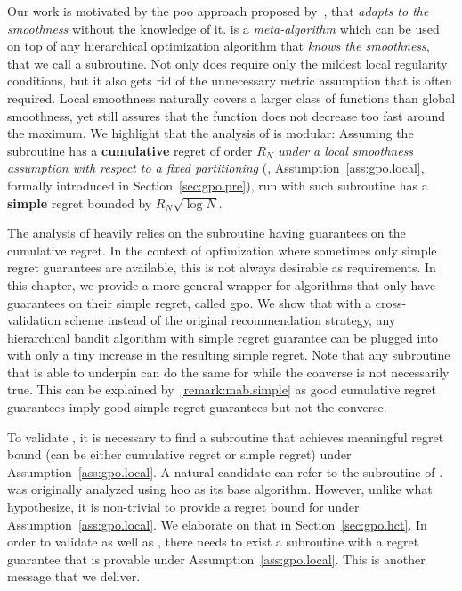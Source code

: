 Our work is motivated by the \gls{poo} approach proposed by~\citet{grill2015poo}, that \emph{adapts to the smoothness} without the knowledge of it. \POO is a \emph{meta-algorithm} which can be used on top of any hierarchical optimization algorithm that \emph{knows the smoothness}, that we call a subroutine. Not only does \POO require only the mildest local regularity conditions, but it also gets rid of the unnecessary metric assumption that is often required. Local smoothness naturally covers a larger class of functions than global smoothness, yet still assures that the function does not decrease too fast around the maximum. We highlight that the analysis of \POO{} is modular: Assuming the subroutine has a \textbf{cumulative} regret of order $R_N$ \emph{under a local smoothness assumption with respect to a fixed partitioning} (\citealt{grill2015poo}, Assumption~\ref{ass:gpo.local}, formally introduced in Section~\ref{sec:gpo.pre}), \POO{} run with such subroutine has a \textbf{simple} regret bounded by $R_N \sqrt{\log N}$. 

The analysis of \POO{} heavily relies on the subroutine having guarantees on the cumulative regret. In the context of optimization where sometimes only simple regret guarantees are available, this is not always desirable as requirements. In this chapter, we provide a more general wrapper for algorithms that only have guarantees on their simple regret, called \gls{gpo}. We show that with a cross-validation scheme instead of the original recommendation strategy, any hierarchical bandit algorithm with simple regret guarantee can be plugged into \GPO{} with only a tiny increase in the resulting simple regret. Note that any subroutine that is able to underpin \POO{} can do the same for \GPO{} while the converse is not necessarily true. This can be explained by~\ref{remark:mab.simple} as good cumulative regret guarantees imply good simple regret guarantees but not the converse.

To validate \GPO{}, it is necessary to find a subroutine that achieves meaningful regret bound (can be either cumulative regret or simple regret) under Assumption~\ref{ass:gpo.local}. A natural candidate can refer to the subroutine of \POO{}. \POO{} was originally analyzed using \gls{hoo} as its base algorithm. However, unlike what~\cite{grill2015poo} hypothesize, it is non-trivial to provide a regret bound for \HOO{} under Assumption~\ref{ass:gpo.local}. We elaborate on that in Section~\ref{sec:gpo.hct}. In order to validate \POO{} as well as \GPO{}, there needs to exist a subroutine with a regret guarantee that is provable under Assumption~\ref{ass:gpo.local}. This is another message that we deliver.

